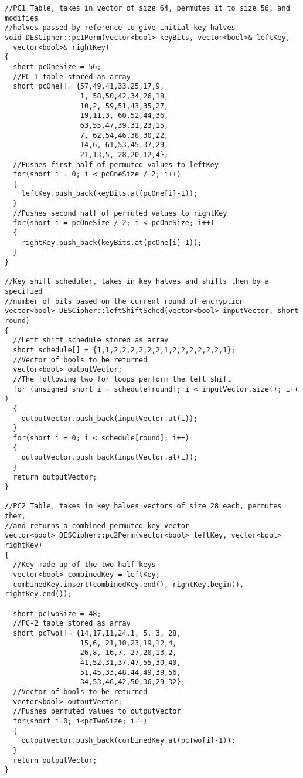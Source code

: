 \documentclass[11pt]{article}
\begin{document}
\begin{verbatim}
//PC1 Table, takes in vector of size 64, permutes it to size 56, and modifies
//halves passed by reference to give initial key halves
void DESCipher::pc1Perm(vector<bool> keyBits, vector<bool>& leftKey,
  vector<bool>& rightKey)
{
  short pcOneSize = 56;
  //PC-1 table stored as array
  short pcOne[]= {57,49,41,33,25,17,9,
                  1, 58,50,42,34,26,18,
                  10,2, 59,51,43,35,27,
                  19,11,3, 60,52,44,36,
                  63,55,47,39,31,23,15,
                  7, 62,54,46,38,30,22,
                  14,6, 61,53,45,37,29,
                  21,13,5, 28,20,12,4};
  //Pushes first half of permuted values to leftKey
  for(short i = 0; i < pcOneSize / 2; i++)
  {
    leftKey.push_back(keyBits.at(pcOne[i]-1));
  }
  //Pushes second half of permuted values to rightKey
  for(short i = pcOneSize / 2; i < pcOneSize; i++)
  {
    rightKey.push_back(keyBits.at(pcOne[i]-1));
  }
}

//Key shift scheduler, takes in key halves and shifts them by a specified
//number of bits based on the current round of encryption
vector<bool> DESCipher::leftShiftSched(vector<bool> inputVector, short round)
{
  //Left shift schedule stored as array
  short schedule[] = {1,1,2,2,2,2,2,2,1,2,2,2,2,2,2,1};
  //Vector of bools to be returned
  vector<bool> outputVector;
  //The following two for loops perform the left shift
  for (unsigned short i = schedule[round]; i < inputVector.size(); i++ )
  {
    outputVector.push_back(inputVector.at(i));
  }
  for(short i = 0; i < schedule[round]; i++)
  {
    outputVector.push_back(inputVector.at(i));
  }
  return outputVector;
}

//PC2 Table, takes in key halves vectors of size 28 each, permutes them,
//and returns a combined permuted key vector
vector<bool> DESCipher::pc2Perm(vector<bool> leftKey, vector<bool> rightKey)
{
  //Key made up of the two half keys
  vector<bool> combinedKey = leftKey;
  combinedKey.insert(combinedKey.end(), rightKey.begin(), rightKey.end());

  short pcTwoSize = 48;
  //PC-2 table stored as array
  short pcTwo[]= {14,17,11,24,1, 5, 3, 28,
                  15,6, 21,10,23,19,12,4,
                  26,8, 16,7, 27,20,13,2,
                  41,52,31,37,47,55,30,40,
                  51,45,33,48,44,49,39,56,
                  34,53,46,42,50,36,29,32};
  //Vector of bools to be returned
  vector<bool> outputVector;
  //Pushes permuted values to outputVector
  for(short i=0; i<pcTwoSize; i++)
  {
    outputVector.push_back(combinedKey.at(pcTwo[i]-1));
  }
  return outputVector;
}


\end{verbatim}
\end{document}

